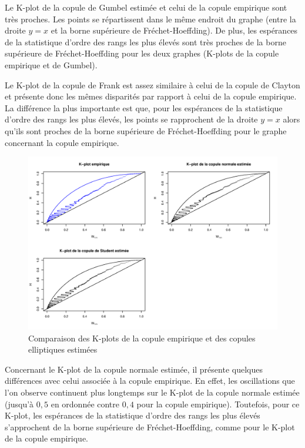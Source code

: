 Le K-plot de la copule de Gumbel estimée et celui de la copule empirique sont très proches. Les points se répartissent dans le même endroit du graphe (entre la droite $y=x$ et la borne supérieure de Fréchet-Hoeffding). De plus, les espérances de la statistique d'ordre des rangs les plus élevés sont très proches de la borne supérieure de Fréchet-Hoeffding pour les deux graphes (K-plots de la copule empirique et de Gumbel). 

Le K-plot de la copule de Frank est assez similaire à celui de la copule de Clayton et présente donc les mêmes disparités par rapport à celui de la copule empirique. La différence la plus importante est que, pour les espérances de la statistique d'ordre des rangs les plus élevés, les points se rapprochent de la droite $y=x$ alors qu'ils sont proches de la borne supérieure de Fréchet-Hoeffding pour le graphe concernant la copule empirique.

\noindent%
\begin{figure}[H]
    \begin{center}
      \includegraphics[width=17 cm, angle=0]{./pictures/ellipcmlkplot.png}
      \centering\caption{\label{2}Comparaison des K-plots de la copule empirique et des copules elliptiques estimées}
    \end{center}
\end{figure}

Concernant le K-plot de la copule normale estimée, il présente quelques différences avec celui associée à la copule empirique. En effet, les oscillations que l'on observe continuent plus longtemps sur le K-plot de la copule normale estimée (jusqu'à $0,5$ en ordonnée contre $0,4$ pour la copule empirique). Toutefois, pour ce K-plot, les espérances de la statistique d'ordre des rangs les plus élevés s'approchent de la borne supérieure de Fréchet-Hoeffding, comme pour le K-plot de la copule empirique.

